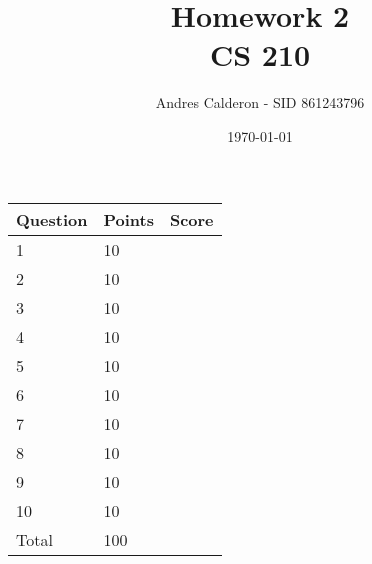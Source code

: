 \documentclass{article}
\title{Homework 2\\CS 210}
\author{Andres Calderon - SID 861243796}
\date{\today}
\begin{document}
\maketitle

\begin{center}
\begin{tabular}{|l|l|p{.4in}|}
\hline Question & Points & Score \\
\hline 1 & 10 & \\
\hline 2 & 10 & \\
\hline 3 & 10 & \\
\hline 4 & 10 & \\
\hline 5 & 10 & \\
\hline 6 & 10 & \\
\hline 7 & 10 & \\
\hline 8 & 10 & \\
\hline 9 & 10 & \\
\hline 10 & 10 & \\
\hline Total & 100 & \\
\hline 
\end{tabular}
\end{center}
\end{document}
